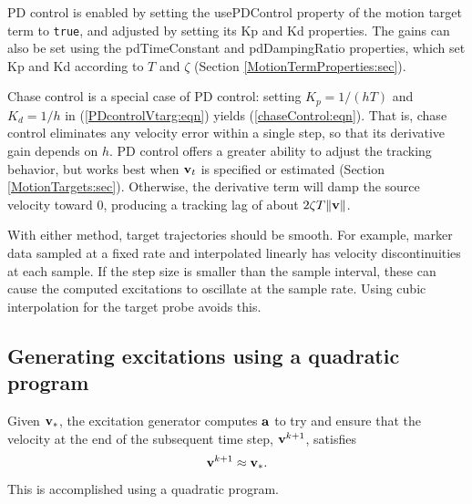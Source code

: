 PD control is enabled by setting the {\sf usePDControl} property of the
motion target term to {\tt true}, and adjusted by setting its {\sf Kp} and
{\sf Kd} properties. The gains can also be set using the {\sf pdTimeConstant} and {\sf pdDampingRatio}
properties, which set {\sf Kp} and {\sf Kd} according to $T$ and $\zeta$
(Section \ref{MotionTermProperties:sec}).

Chase control is a special case of PD control: setting $K_p = 1/(h T)$ and $K_d
= 1/h$ in (\ref{PDcontrolVtarg:eqn}) yields (\ref{chaseControl:eqn}).  That is,
chase control eliminates any velocity error within a single step, so that its
derivative gain depends on $h$. PD control offers a greater ability to adjust
the tracking behavior, but works best when ${\bf v}_t$ is specified or estimated
(Section \ref{MotionTargets:sec}). Otherwise, the derivative term will damp the
source velocity toward 0, producing a tracking lag of about $2 \zeta T \|{\bf v}\|$.

\begin{sideblock}
With either method, target trajectories should be smooth. For example,
marker data sampled at a fixed rate and interpolated linearly has velocity
discontinuities at each sample. If the step size is smaller than the sample
interval, these can cause the computed excitations to oscillate at the
sample rate. Using cubic interpolation for the target probe avoids this.
\end{sideblock}

\subsection{Generating excitations using a quadratic program}
\label{GeneratingExcitations:sec}

Given ${\bf v}_*$, the excitation generator computes ${\bf a}$ to try and ensure that the
velocity at the end of the subsequent time step, ${\bf v}^{k+1}$, satisfies
%
\begin{equation}
{\bf v}^{k+1} \approx {\bf v}_*.
\label{vtrack:eqn}
\end{equation}
%
This is accomplished using a quadratic program.

